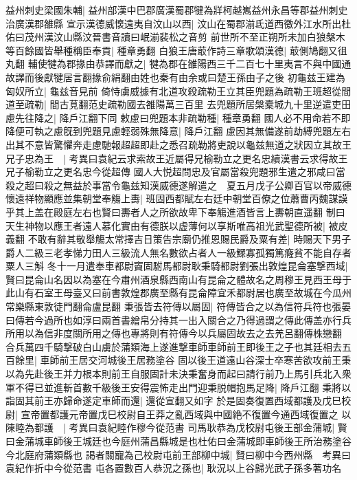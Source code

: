 益州刺史梁國朱輔|{
	益州部漢中巴郡廣漢蜀郡犍為牂柯越嶲益州永昌等郡益州刺史治廣漢郡雒縣}
宣示漢德威懷遠夷自汶山以西|{
	汶山在蜀郡湔氐道西徼外江水所出杜佑曰茂州漢汶山縣汶晉書音讀曰岷湔裴松之音剪}
前世所不至正朔所未加白狼槃木等百餘國皆舉種稱臣奉貢|{
	種章勇翻}
白狼王唐菆作詩三章歌頌漢德|{
	菆側鳩翻又徂丸翻}
輔使犍為郡掾由恭譯而獻之|{
	犍為郡在雒陽西三千二百七十里夷言不與中國通故譯而後獻犍居言翻掾俞絹翻由姓也秦有由余或曰楚王孫由子之後}
初龜兹王建為匈奴所立|{
	龜兹音見前}
倚恃虜威據有北道攻殺疏勒王立其臣兜題為疏勒王班超從間道至疏勒|{
	間古莧翻范史疏勒國去雒陽萬三百里}
去兜題所居槃槖城九十里逆遣吏田慮先往降之|{
	降戶江翻下同}
敕慮曰兜題本非疏勒種|{
	種章勇翻}
國人必不用命若不即降便可執之慮旣到兜題見慮輕弱殊無降意|{
	降戶江翻}
慮因其無備遂前劫縛兜題左右出其不意皆驚懼奔走慮馳報超超即赴之悉召疏勒將吏說以龜兹無道之狀因立其故王兄子忠為王　|{
	考異曰袁紀云求索故王近屬得兄榆勒立之更名忠續漢書云求得故王兄子榆勒立之更名忠今從超傳}
國人大悦超問忠及官屬當殺兜題邪生遣之邪咸曰當殺之超曰殺之無益於事當令龜兹知漢威德遂解遣之　夏五月戊子公卿百官以帝威德懷遠祥物顯應並集朝堂奉觴上夀|{
	班固西都賦左右廷中朝堂百僚之位蕭曹丙魏謀謨乎其上盖在殿庭左右也賢曰夀者人之所欲故卑下奉觴進酒皆言上夀朝直遥翻}
制曰天生神物以應王者遠人慕化實由有德朕以虚薄何以享斯唯高祖光武聖德所被|{
	被皮義翻}
不敢有辭其敬舉觴太常擇吉日策告宗廟仍推恩賜民爵及粟有差|{
	時賜天下男子爵人二級三老孝悌力田人三級流人無名數欲占者人一級鰥寡孤獨篤癃貧不能自存者粟人三斛}
冬十一月遣奉車都尉竇固駙馬都尉耿秉騎都尉劉張出敦煌昆侖塞撃西域|{
	賢曰昆侖山名因以為塞在今肅州酒泉縣西南山有昆侖之體故名之周穆王見西王母于此山有石室王母臺又曰前書敦煌郡廣至縣有昆侖障宜禾都尉居也廣至故城在今瓜州常樂縣東敦徒門翻侖盧昆翻}
秉張皆去符傳以屬固|{
	符傳皆合之以為信符兵符也張晏曰傳若今過所也如淳曰兩首書繒帛分持其一出入關合之乃得過謂之傳此傳盖亦行兵所用以為信非度關所用之傳也專將則有符傳今以兵屬固故去之去羌呂翻傳株戀翻}
合兵萬四千騎撃破白山虜於蒲類海上遂進撃車師車師前王即後王之子也其廷相去五百餘里|{
	車師前王居交河城後王居務塗谷}
固以後王道遠山谷深士卒寒苦欲攻前王秉以為先赴後王并力根本則前王自服固計未決秉奮身而起曰請行前乃上馬引兵北入衆軍不得已並進斬首數千級後王安得震怖走出門迎秉脱帽抱馬足降|{
	降戶江翻}
秉將以詣固其前王亦歸命遂定車師而還|{
	還從宣翻又如字}
於是固奏復置西域都護及戊巳校尉|{
	宣帝置都護元帝置戊巳校尉自王莽之亂西域與中國絶不復置今通西域復置之}
以陳睦為都護　|{
	考異曰袁紀睦作穆今從范書}
司馬耿恭為戊校尉屯後王部金蒲城|{
	賢曰金蒲城車師後王城廷也今庭州蒲昌縣城是也杜佑曰金蒲城即車師後王所治務塗谷今北庭府蒲類縣也}
謁者關寵為己校尉屯前王部柳中城|{
	賢曰柳中今西州縣　考異曰袁紀作折中今從范書}
屯各置數百人恭況之孫也|{
	耿況以上谷歸光武子孫多著功名}


